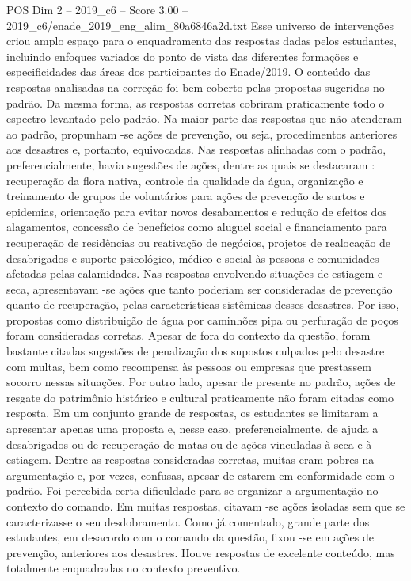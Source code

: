 \begin{textsample}{POS Dim 2 – 2019\_c6 – Score 3.00 – 2019\_c6/enade\_2019\_eng\_alim\_80a6846a2d.txt}
Esse universo de intervenções criou amplo espaço para o enquadramento das respostas dadas pelos estudantes, incluindo enfoques variados do ponto de vista das diferentes formações e especificidades das áreas dos participantes do Enade/2019.
O conteúdo das respostas analisadas na correção foi bem coberto pelas propostas sugeridas no padrão.
Da mesma forma, as respostas corretas cobriram praticamente todo o espectro levantado pelo padrão.
Na maior parte das respostas que não atenderam ao padrão, propunham -se ações de prevenção, ou seja, procedimentos anteriores aos desastres e, portanto, equivocadas.
Nas respostas alinhadas com o padrão, preferencialmente, havia sugestões de ações, dentre as quais se destacaram : recuperação da flora nativa, controle da qualidade da água, organização e treinamento de grupos de voluntários para ações de prevenção de surtos e epidemias, orientação para evitar novos desabamentos e redução de efeitos dos alagamentos, concessão de benefícios como aluguel social e financiamento para recuperação de residências ou reativação de negócios, projetos de realocação de desabrigados e suporte psicológico, médico e social às pessoas e comunidades afetadas pelas calamidades.
Nas respostas envolvendo situações de estiagem e seca, apresentavam -se ações que tanto poderiam ser consideradas de prevenção quanto de recuperação, pelas características sistêmicas desses desastres.
Por isso, propostas como distribuição de água por caminhões pipa ou perfuração de poços foram consideradas corretas.
Apesar de fora do contexto da questão, foram bastante citadas sugestões de penalização dos supostos culpados pelo desastre com multas, bem como recompensa às pessoas ou empresas que prestassem socorro nessas situações.
Por outro lado, apesar de presente no padrão, ações de resgate do patrimônio histórico e cultural praticamente não foram citadas como resposta.
Em um conjunto grande de respostas, os estudantes se limitaram a apresentar apenas uma proposta e, nesse caso, preferencialmente, de ajuda a desabrigados ou de recuperação de matas ou de ações vinculadas à seca e à estiagem.
Dentre as respostas consideradas corretas, muitas eram pobres na argumentação e, por vezes, confusas, apesar de estarem em conformidade com o padrão.
Foi percebida certa dificuldade para se organizar a argumentação no contexto do comando.
Em muitas respostas, citavam -se ações isoladas sem que se caracterizasse o seu desdobramento.
Como já comentado, grande parte dos estudantes, em desacordo com o comando da questão, fixou -se em ações de prevenção, anteriores aos desastres.
Houve respostas de excelente conteúdo, mas totalmente enquadradas no contexto preventivo.

\end{textsample}
